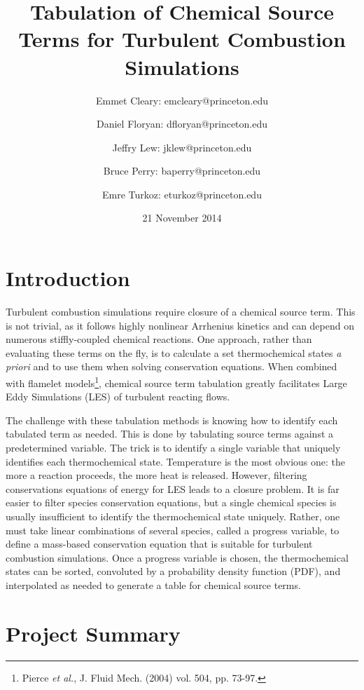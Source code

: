 \documentclass[11pt]{article}
\begin{document}
\title{\textbf{Tabulation of Chemical Source Terms for Turbulent
    Combustion Simulations}}

\author{Emmet Cleary: emcleary@princeton.edu \and Daniel Floryan:
  dfloryan@princeton.edu \and Jeffry Lew: jklew@princeton.edu \and
  Bruce Perry: baperry@princeton.edu \and Emre Turkoz:
  eturkoz@princeton.edu} 

\date{21 November 2014 }
\maketitle

\section{Introduction}

Turbulent combustion simulations require closure of a chemical source
term. This is not trivial, as it follows highly nonlinear Arrhenius
kinetics and can depend on numerous stiffly-coupled chemical
reactions. One approach, rather than evaluating these terms on the
fly, is to calculate a set thermochemical states \textit{a priori} and
to use them when solving conservation equations. When combined with
flamelet models\footnote{Pierce \textit{et al.}, J. Fluid Mech. (2004)
  vol. 504, pp. 73-97.}, chemical source term tabulation greatly
facilitates Large Eddy Simulations (LES) of turbulent reacting flows.

The challenge with these tabulation methods is knowing how to identify
each tabulated term as needed.  This is done by tabulating source
terms against a predetermined variable. The trick is to identify a
single variable that uniquely identifies each thermochemical
state. Temperature is the most obvious one: the more a reaction
proceeds, the more heat is released. However, filtering conservations
equations of energy for LES leads to a closure problem. It is far
easier to filter species conservation equations, but a single chemical
species is usually insufficient to identify the thermochemical state
uniquely. Rather, one must take linear combinations of several
species, called a progress variable, to define a mass-based
conservation equation that is suitable for turbulent combustion
simulations. Once a progress variable is chosen, the thermochemical
states can be sorted, convoluted by a probability density function
(PDF), and interpolated as needed to generate a table for chemical
source terms.

\section{Project Summary}
\end{document}
